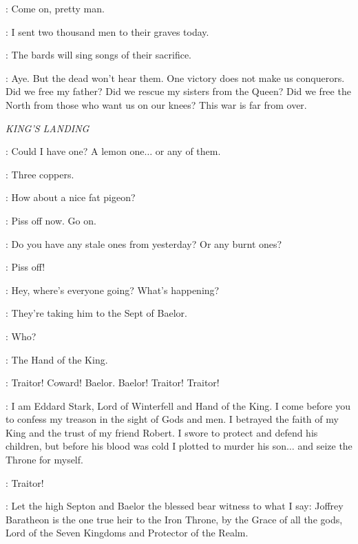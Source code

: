\UMBER: Come on, pretty man. 


\ROBB: I sent two thousand men to their graves today. 

\THEON: The bards will sing songs of their sacrifice. 

\ROBB: Aye. But the dead won't hear them.  One victory does not make us conquerors. Did we free my father? Did we rescue my sisters from the Queen? Did we free the North from those who want us on our knees? This war is far from over. 


\scene

\textit{KING'S LANDING}


\ARYA: Could I have one? A lemon one$\ldots$ or any of them. 

\PIESELLER: Three coppers. 

\ARYA: How about a nice fat pigeon? 

\PIESELLER: Piss off now. Go on. 

\ARYA: Do you have any stale ones from yesterday? Or any burnt ones? 

\PIESELLER: Piss off! 

\ARYA: Hey, where's everyone going? What's happening? 

\URCHIN: They're taking him to the Sept of Baelor. 

\ARYA: Who? 

\URCHIN: The Hand of the King. 


\CROWD: Traitor! Coward! Baelor. Baelor! Traitor! Traitor! 

\NED: I am Eddard Stark, Lord of Winterfell and Hand of the King. I come before you to confess my treason in the sight of Gods and men. I betrayed the faith of my King and the trust of my friend Robert. I swore to protect and defend his children, but before his blood was cold I plotted to murder his son$\ldots$ and seize the Throne for myself. 

\CROWD: Traitor! 

\NED: Let the high Septon and Baelor the blessed bear witness to what I say: Joffrey Baratheon is the one true heir to the Iron Throne, by the Grace of all the gods, Lord of the Seven Kingdoms and Protector of the Realm. 

